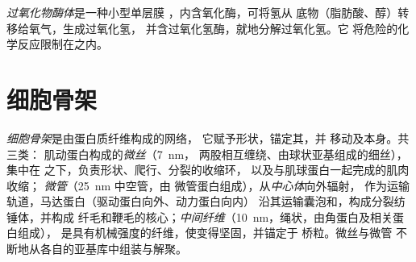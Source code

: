 \begin{definition}[过氧化物酶体]\label{def:b1:eukaryotic-cell:peroxisome}
\emph{过氧化物酶体}是一种小型单层膜
，内含氧化酶，可将氢从
底物（脂肪酸、醇）转移给氧气，生成过氧化氢，
并含过氧化氢酶，就地分解过氧化氢。它
将危险的化学反应限制在之内。
\end{definition}

\section{细胞骨架}

\begin{definition}[细胞骨架]\label{def:b1:eukaryotic-cell:cytoskeleton}
\emph{细胞骨架}是由蛋白质纤维构成的网络，
它赋予形状，锚定其，并
移动及本身。共三类：
肌动蛋白构成的\emph{微丝}（\qty{7}{nm}，
两股相互缠绕、由球状亚基组成的细丝），集中在
之下，负责形状、爬行、分裂的收缩环，
以及与肌球蛋白一起完成的肌肉收缩；
\emph{微管}（\qty{25}{nm} 中空管，由
微管蛋白组成），从\emph{中心体}向外辐射，
作为运输轨道，马达蛋白（驱动蛋白向外、动力蛋白向内）
沿其运输囊泡和，构成分裂纺锤体，并构成
纤毛和鞭毛的核心；\emph{中间纤维}（\qty{10}{nm}，绳状，由角蛋白及相关蛋白组成），
是具有机械强度的纤维，使变得坚固，并锚定于
桥粒。微丝与微管
不断地从各自的亚基库中组装与解聚。
\end{definition}

